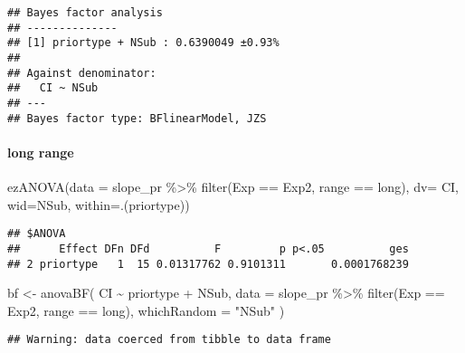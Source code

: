 \documentclass[
]{article}
\newenvironment{Shaded}{\begin{snugshade}}{\end{snugshade}}
\newcommand{\AttributeTok}[1]{\textcolor[rgb]{0.77,0.63,0.00}{#1}}
\newcommand{\FunctionTok}[1]{\textcolor[rgb]{0.00,0.00,0.00}{#1}}
\newcommand{\NormalTok}[1]{#1}
\newcommand{\OtherTok}[1]{\textcolor[rgb]{0.56,0.35,0.01}{#1}}
\newcommand{\SpecialCharTok}[1]{\textcolor[rgb]{0.00,0.00,0.00}{#1}}
\newcommand{\StringTok}[1]{\textcolor[rgb]{0.31,0.60,0.02}{#1}}
\begin{document}
\begin{verbatim}
## Bayes factor analysis
## --------------
## [1] priortype + NSub : 0.6390049 ±0.93%
## 
## Against denominator:
##   CI ~ NSub 
## ---
## Bayes factor type: BFlinearModel, JZS
\end{verbatim}

\hypertarget{long-range-1}{%
\paragraph{long range}\label{long-range-1}}

\begin{Shaded}
\begin{Highlighting}[]
\FunctionTok{ezANOVA}\NormalTok{(}\AttributeTok{data =}\NormalTok{ slope\_pr }\SpecialCharTok{\%\textgreater{}\%} \FunctionTok{filter}\NormalTok{(Exp }\SpecialCharTok{==} \StringTok{\textquotesingle{}Exp2\textquotesingle{}}\NormalTok{, range }\SpecialCharTok{==} \StringTok{\textquotesingle{}long\textquotesingle{}}\NormalTok{), }\AttributeTok{dv=}\NormalTok{ CI, }\AttributeTok{wid=}\NormalTok{NSub, }\AttributeTok{within=}\NormalTok{.(priortype))}
\end{Highlighting}
\end{Shaded}

\begin{verbatim}
## $ANOVA
##      Effect DFn DFd          F         p p<.05          ges
## 2 priortype   1  15 0.01317762 0.9101311       0.0001768239
\end{verbatim}

\begin{Shaded}
\begin{Highlighting}[]
\NormalTok{bf }\OtherTok{\textless{}{-}} \FunctionTok{anovaBF}\NormalTok{( CI }\SpecialCharTok{\textasciitilde{}}\NormalTok{ priortype }\SpecialCharTok{+}\NormalTok{ NSub, }\AttributeTok{data =}\NormalTok{  slope\_pr }\SpecialCharTok{\%\textgreater{}\%} \FunctionTok{filter}\NormalTok{(Exp }\SpecialCharTok{==} \StringTok{\textquotesingle{}Exp2\textquotesingle{}}\NormalTok{, range }\SpecialCharTok{==} \StringTok{\textquotesingle{}long\textquotesingle{}}\NormalTok{), }\AttributeTok{whichRandom =} \StringTok{"NSub"}\NormalTok{ ) }
\end{Highlighting}
\end{Shaded}

\begin{verbatim}
## Warning: data coerced from tibble to data frame
\end{verbatim}
\end{document}
